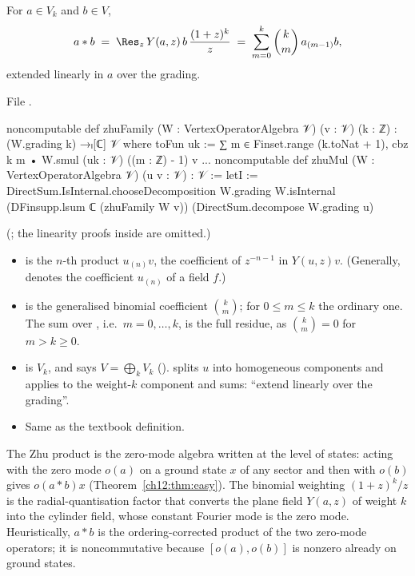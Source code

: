 \begin{definition}\label{ch12:def:zhumul}
For $a\in V_k$ and $b\in V$,
\begin{equation*}
  a\ast b\;=\;\Res_z\,Y(a,z)\,b\,\frac{(1+z)^{k}}{z}\;=\;\sum_{m=0}^{k}\binom{k}{m}\,a_{(m-1)}b,
\end{equation*}
extended linearly in $a$ over the grading.
\end{definition}
File .
\begin{leancode}
noncomputable def zhuFamily (W : VertexOperatorAlgebra 𝒱) (v : 𝒱) (k : ℤ) :
    (W.grading k) →ₗ[ℂ] 𝒱 where  toFun uk := ∑ m ∈ Finset.range (k.toNat + 1), cbz k m • W.smul (uk : 𝒱) ((m : ℤ) - 1) v
  ...
noncomputable def zhuMul (W : VertexOperatorAlgebra 𝒱) (u v : 𝒱) : 𝒱 :=
  letI := DirectSum.IsInternal.chooseDecomposition W.grading W.isInternal
  (DFinsupp.lsum ℂ (zhuFamily W v)) (DirectSum.decompose W.grading u)
\end{leancode}
(; the linearity proofs inside  are omitted.)
\begin{dictionary}
\begin{itemize}
\item {} is the $n$-th product $u_{(n)}v$, the coefficient of $z^{-n-1}$ in
  $Y(u,z)v$.  (Generally,  denotes the coefficient $u_{(n)}$ of a field $f$.)
\item {} is the generalised binomial coefficient $\binom km$; for $0\le m\le k$ the
  ordinary one.  The sum over , i.e.\ $m=0,\dots,k$, is the full
  residue, as $\binom km=0$ for $m>k\ge0$.
\item {} is $V_k$, and  says $V=\bigoplus_kV_k$
  ().   splits $u$ into homogeneous components and
   applies  to the weight-$k$ component and sums: ``extend
  linearly over the grading''.
\item Same as the textbook definition.
\end{itemize}
\end{dictionary}

\begin{physics}
The Zhu product is the zero-mode algebra written at the level of states: acting with the zero mode $o(a)$ on a ground state $x$ of any sector and then with $o(b)$ gives $o(a\ast b)x$ (Theorem~\ref{ch12:thm:easy}). The binomial weighting $(1+z)^k/z$ is the radial-quantisation factor that converts the plane field $Y(a,z)$ of weight $k$ into the cylinder field, whose constant Fourier mode is the zero mode. Heuristically, $a\ast b$ is the ordering-corrected product of the two zero-mode operators; it is noncommutative because $[o(a),o(b)]$ is nonzero already on ground states.
\end{physics}

